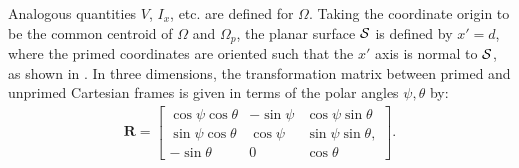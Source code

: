 Analogous quantities $V$, $I_x$, etc. are defined for $\Omega$.  Taking the coordinate origin to be the common centroid of $\Omega$ and $\Omega_p$, the planar surface $\mathcal{S}$ is defined by $x' = d$, where the primed coordinates are oriented such that the $x'$ axis is normal to $\mathcal{S}$, as shown in .  In three dimensions, the transformation matrix between primed and unprimed Cartesian frames is given in terms of the polar angles $\psi, \theta$ by:
\begin{gather}
\bm{R} = \left[\begin{array} {ccc} {\cos\psi\cos\theta} & {-\sin\psi} & {\cos\psi\sin\theta}\\ {\sin\psi\cos\theta} & {\cos\psi} & {\sin\psi\sin\theta}, \\
{-\sin\theta} & {0} & {\cos\theta}\end{array} \right].
\end{gather}



